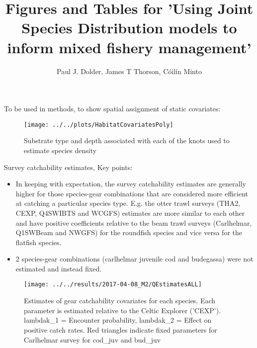 \documentclass[11pt]{article}
\title{Figures and Tables for 'Using Joint Species Distribution models to
	inform mixed fishery management'}
\author{Paul J. Dolder, James T Thorson, Cóilín Minto}
\begin{document}
\maketitle

\tableofcontents

\listoffigures

\listoftables

\newpage

To be used in methods, to show spatial assignment of static covariates:

\begin{figure}[!ht]
	\center
	\texttt{[image: ../../plots/HabitatCovariatesPoly]}
	\label{fig:HabCov}
	\caption{Substrate type and depth associated with each of the knots
		used to estimate species density}
\end{figure}


\newpage

Survey catchability estimates, 
Key points:

\begin{itemize}
	\item In keeping with expectation, the survey catchability estimates
		are generally higher for those species-gear combinations that
		are considered more efficient at catching a particular species
		type. E.g. the otter trawl surveys (THA2, CEXP, Q4SWIBTS and
		WCGFS) estimates are more similar to each other and have
		positive coefficients relative to the beam trawl surveys
		(Carlhelmar, Q1SWBeam and NWGFS) for the roundfish species and
		vice versa for the flatfish species.
	\item 2 species-gear combinations (carlhelmar juvenile cod and
		budegassa) were not estimated and instead fixed. 
\end{itemize}

\begin{figure}[!ht]
	\center
	\texttt{[image: ../../results/2017-04-08\_M2/QEstimatesALL]}
	\label{fig:Q_inline}
	\caption[Gear catchability estimates]{Estimates of gear catchability
		covariates for each species.  Each parameter is estimated
		relative to the Celtic Explorer ('CEXP'). lambdak\_1 =
		Encounter probability, lambdak\_2 = Effect on positive catch
		rates. Red triangles indicate fixed parameters for Carlhelmar
		survey for cod\_juv and bud\_juv}
\end{figure}

\newpage
\end{document}
